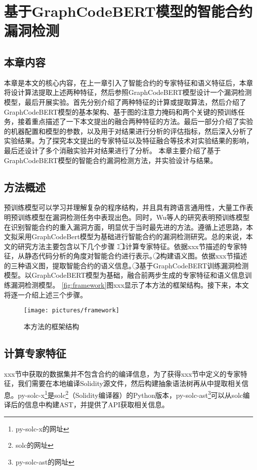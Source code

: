 \chapter{基于GraphCodeBERT模型的智能合约漏洞检测}
\section{本章内容}
\label{sec:本章内容4}
本章是本文的核心内容，在上一章引入了智能合约的专家特征和语义特征后，本章将设计算法提取上述两种特征，然后参照GraphCodeBERT模型设计一个漏洞检测模型，最后开展实验。首先分别介绍了两种特征的计算或提取算法，然后介绍了GraphCodeBERT模型的基本架构、基于图的注意力掩码和两个关键的预训练任务，接着重点描述了一下本文提出的融合两种特征的方法。最后一部分介绍了实验的机器配置和模型的参数，以及用于对结果进行分析的评估指标，然后深入分析了实验结果。为了探究本文提出的专家特征以及特征融合等技术对实验结果的影响，最后还设计了多个消融实验并对结果进行了分析。
本章主要介绍了基于GraphCodeBERT模型的智能合约漏洞检测方法，并实验设计与结果。
\section{方法概述}
\label{sec:方法概述}
预训练模型可以学习并理解复杂的程序结构，并且具有跨语言通用性，大量工作表明预训练模型在漏洞检测任务中表现出色\cite{pretrained_is_good_1,pretrained_is_good_2,pretrained_is_good_3}。同时，Wu等人的研究表明预训练模型在识别智能合约的重入漏洞方面，明显优于当时最先进的方法\cite{wu2021peculiar}。遵循上述思路，本文拟采用GraphCodeBert模型为基础进行智能合约的漏洞检测研究。总的来说，本文的研究方法主要包含以下几个步骤：\textcircled{1}计算专家特征。依据xxx节描述的专家特征，从静态代码分析的角度对智能合约进行表示。\textcircled{2}构建语义图。依据xxx节描述的三种语义图，提取智能合约的语义信息。\textcircled{3}基于GraphCodeBERT训练漏洞检测模型。以GraphCodeBERT模型为基础，融合前两步生成的专家特征和语义信息训练漏洞检测模型。
\autoref{fig:framework}图xxx显示了本方法的框架结构。接下来，本文将逐一介绍上述三个步骤。
\begin{figure}[htbp]
    \centering
    \texttt{[image: pictures/framework]}
    \caption{\label{fig:framework}本方法的框架结构}
\end{figure}

\section{计算专家特征}
\label{sec:计算专家特征}
xxx节中获取的数据集并不包含合约的编译信息，为了获得xxx节中定义的专家特征，我们需要在本地编译Solidity源文件，然后构建抽象语法树再从中提取相关信息。py-solc-x\footnote{py-solc-x的网址}是solc\footnote{solc的网址}（Solidity编译器）的Python版本，py-solc-ast\footnote{py-solc-ast的网址}可以从solc编译后的信息中构建AST，并提供了API获取相关信息。

